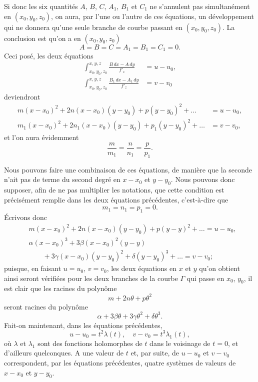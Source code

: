 \documentclass{article}
\begin{document}
Si donc les six quantités $A$, $B$, $C$, $A_{1}$, $B_{1}$ et $C_{1}$ ne s'annulent pas simultanément en $(x_{0}, y_{0}, z_{0})$, on aura, par l'une ou l'autre de ces équations, un développement qui ne donnera qu'une seule branche de courbe passant en $(x_{0}, y_{0}, z_{0})$. La conclusion est qu'on a en $(x_{0}, y_{0}, z_{0})$
\[
A = B = C = A_{1} = B_{1} = C_{1} = 0.
\]
Ceci posé, les deux équations
\[
\begin{aligned}
\int_{x_{0}, y_{0}, z_{0}}^{x, y, z} \frac{B\,dx - A\,dy}{f'_{z}} &= u - u_{0}, \\
\int_{x_{0}, y_{0}, z_{0}}^{x, y, z} \frac{B_{1}\,dx - A_{1}\,dy}{f'_{z}} &= v - v_{0}
\end{aligned}
\]
deviendront
\[
\begin{aligned}
m(x - x_{0})^{2} + 2n(x - x_{0})(y - y_{0}) + p(y - y_{0})^{2} + \ldots &= u - u_{0}, \\
m_{1}(x - x_{0})^{2} + 2n_{1}(x - x_{0})(y - y_{0}) + p_{1}(y - y_{0})^{2} + \ldots &= v - v_{0},
\end{aligned}
\]
et l'on aura évidemment
\[
\frac{m}{m_{1}} = \frac{n}{n_{1}} = \frac{p}{p_{1}}.
\]

Nous pouvons faire une combinaison de ces équations, de manière que la seconde n'ait pas de terme du second degré en $x - x_{0}$ et $y - y_{0}$. Nous pouvons donc supposer, afin de ne pas multiplier les notations, que cette condition est précisément remplie dans les deux équations précédentes, c'est-à-dire que
\[
m_{1} = n_{1} = p_{1} = 0.
\]
Écrivons donc
\[
\begin{aligned}
&m(x - x_{0})^{2} + 2n(x - x_{0})(y - y_{0}) + p(y - y)^{2} + \ldots = u - u_{0}, \\
&\alpha(x - x_{0})^{3} + 3\beta(x - x_{0})^{2}(y - y) \\
&\qquad + 3\gamma(x - x_{0})(y - y_{0})^{2} + \delta(y - y_{0})^{3} + \ldots = v - v_{0};
\end{aligned}
\]
puisque, en faisant $u = u_{0}$, $v = v_{0}$, les deux équations en $x$ et $y$ qu'on obtient ainsi seront vérifiées pour les deux branches de la courbe $\Gamma$ qui passe en $x_{0}$, $y_{0}$, il est clair que les racines du polynôme
\[
m + 2n\theta + p\theta^{2}
\]
seront racines du polynôme
\[
\alpha + 3\beta\theta + 3\gamma\theta^{2} + \delta\theta^{3}.
\]
Fait-on maintenant, dans les équations précédentes,
\[
u - u_{0} = t^{2}\lambda(t), \quad v - v_{0} = t^{3}\lambda_{1}(t),
\]
où $\lambda$ et $\lambda_{1}$ sont des fonctions holomorphes de $t$ dans le voisinage de $t = 0$, et d'ailleurs quelconques. A une valeur de $t$ et, par suite, de $u - u_{0}$ et $v - v_{0}$ correspondent, par les équations précédentes, quatre systèmes de valeurs de $x - x_{0}$ et $y - y_{0}$.
\end{document}
